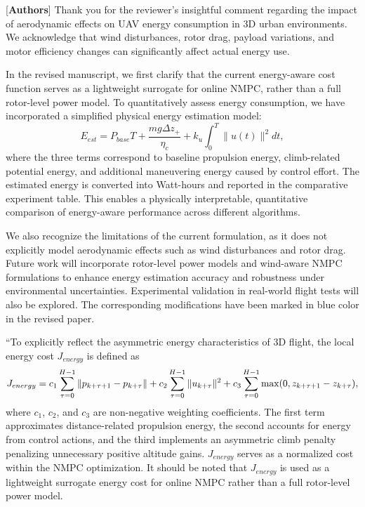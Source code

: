\documentclass[12pt, twosides]{article}
\theoremstyle{definition}
\begin{document}
 \textcolor[rgb]{0.00,0.00,1.00}{[\textbf{Authors}]} Thank you for the reviewer's insightful comment regarding the impact of aerodynamic effects on UAV energy consumption in 3D urban environments. We acknowledge that wind disturbances, rotor drag, payload variations, and motor efficiency changes can significantly affect actual energy use. 

In the revised manuscript, we first clarify that the current energy-aware cost function serves as a lightweight surrogate for online NMPC, rather than a full rotor-level power model. To quantitatively assess energy consumption, we have incorporated a simplified physical energy estimation model:
\[
E_{est} = P_{base} T + \frac{m g \Delta z_+}{\eta_c} + k_u \int_0^T \| u(t) \|^2 dt,
\]
where the three terms correspond to baseline propulsion energy, climb-related potential energy, and additional maneuvering energy caused by control effort. The estimated energy is converted into Watt-hours and reported in the comparative experiment table. This enables a physically interpretable, quantitative comparison of energy-aware performance across different algorithms.

We also recognize the limitations of the current formulation, as it does not explicitly model aerodynamic effects such as wind disturbances and rotor drag. Future work will incorporate rotor-level power models and wind-aware NMPC formulations to enhance energy estimation accuracy and robustness under environmental uncertainties. Experimental validation in real-world flight tests will also be explored. The corresponding modifications have been marked in blue color in the revised paper.

``To explicitly reflect the asymmetric energy characteristics of 3D flight, the local energy cost $J_{energy}$ is defined as
\[
\small
J_{energy}
= c_1 \sum_{\tau=0}^{H-1} \| {p}_{k+\tau+1} - {p}_{k+\tau} \|
+ c_2 \sum_{\tau=0}^{H-1} \| {u}_{k+\tau} \|^2
+ c_3 \sum_{\tau=0}^{H-1} \max(0, z_{k+\tau+1} - z_{k+\tau}),
\]
where $c_1$, $c_2$, and $c_3$ are non-negative weighting coefficients. The first term approximates distance-related propulsion energy, the second accounts for energy from control actions, and the third implements an asymmetric climb penalty penalizing unnecessary positive altitude gains. $J_{energy}$ serves as a normalized cost within the NMPC optimization. It should be noted that $J_{energy}$ is used as a lightweight surrogate energy cost for online NMPC rather than a full rotor-level power model.
\end{document}
